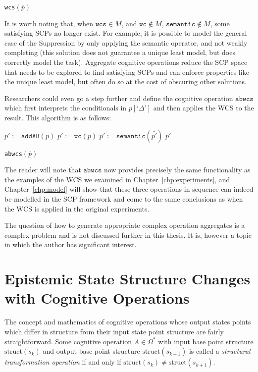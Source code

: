 {\begin{algorithm}[H]
\caption{\texttt{wcs}$(\bar{p})$}
\label{cogOp:wcs}
\end{algorithm}

It is worth noting that, when $\texttt{wcs} \in M$, and $\texttt{wc} \not\in M$, $\texttt{semantic}\not\in M$, some satisfying SCPs no longer exist. For example, it is possible to model the general case of the Suppression by only applying the semantic operator, and not weakly completing (this solution does not guarantee a unique least model, but does correctly model the task). Aggregate cognitive operations reduce the SCP space that needs to be explored to find satisfying SCPs and can enforce properties like the unique least model, but often do so at the cost of obscuring other solutions.

Researchers could even go a step further and define the cognitive operation $\texttt{abwcs}$ which first interprets the conditionals in $p[\textrm{`}\Delta\textrm{'}]$ and then applies the WCS to the result. This algorithm is as follows:

\begin{algorithm}[H] 
\SetAlgoLined
{}
{
$\bar{p}':=\texttt{addAB}(\bar{p})$\;
$\bar{p}':=\texttt{wc}(\bar{p})$\;
$p':=\texttt{semantic}(\bar{p'})$\;
\Return $p'$
}

\caption{\texttt{abwcs}$(\bar{p})$}
\label{cogOp:abwcs}
\end{algorithm}

The reader will note that $\texttt{abwcs}$ now provides precisely the same functionality as the examples of the WCS we examined in Chapter~\ref{chp:experiments}, and Chapter~\ref{chp:model} will show that these three operations in sequence can indeed be modelled in the SCP framework and come to the same conclusions as when the WCS is applied in the original experiments.

The question of how to generate appropriate complex operation aggregates is a complex problem and is not discussed further in this thesis. It is, however a topic in which the author has significant interest.


\section{Epistemic State Structure Changes with Cognitive Operations}
The concept and mathematics of cognitive operations whose output states points which differ in structure from their input state point structure are fairly straightforward. Some cognitive operation $A \in \Omega^*$ with input base point structure $\textrm{struct}(s_k)$ and output base point structure $\textrm{struct}(s_{k+1})$ is called a \textit{structural transformation operation} if and only if $\textrm{struct}(s_k) \ne \textrm{struct}(s_{k+1})$.

}
